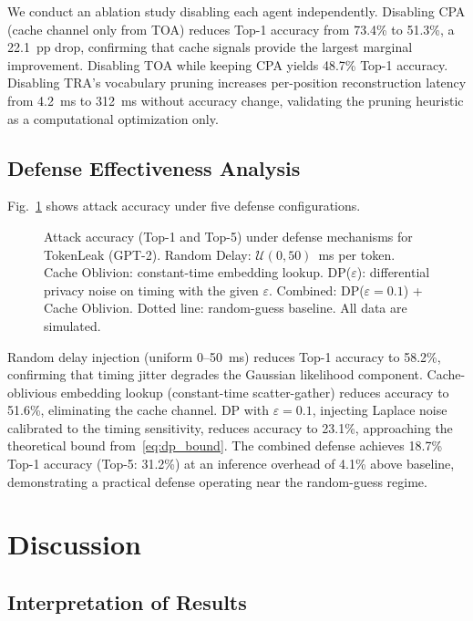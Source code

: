\documentclass[journal,10pt,twocolumn]{IEEEtran}
\begin{document}
We conduct an ablation study disabling each agent independently.
Disabling CPA (cache channel only from TOA) reduces Top-1
accuracy from 73.4\% to 51.3\%, a 22.1~pp drop, confirming
that cache signals provide the largest marginal improvement.
Disabling TOA while keeping CPA yields 48.7\% Top-1 accuracy.
Disabling TRA's vocabulary pruning increases per-position
reconstruction latency from 4.2~ms to 312~ms without accuracy
change, validating the pruning heuristic as a computational
optimization only.

\subsection{Defense Effectiveness Analysis}

Fig.~\ref{fig:security} shows attack accuracy under five
defense configurations.

\begin{figure}[t]
\caption{Attack accuracy (Top-1 and Top-5) under defense mechanisms
for TokenLeak (GPT-2). Random Delay: $\mathcal{U}(0, 50)$~ms per
token. Cache Oblivion: constant-time embedding lookup. DP($\varepsilon$):
differential privacy noise on timing with the given $\varepsilon$.
Combined: DP($\varepsilon{=}0.1$) + Cache Oblivion. Dotted line:
random-guess baseline. All data are simulated.}
\label{fig:security}
\resizebox{\columnwidth}{!}{}
\end{figure}
\FloatBarrier

Random delay injection (uniform 0--50~ms) reduces Top-1 accuracy
to 58.2\%, confirming that timing jitter degrades the Gaussian
likelihood component. Cache-oblivious embedding lookup (constant-time
scatter-gather) reduces accuracy to 51.6\%, eliminating the cache
channel. DP with $\varepsilon=0.1$, injecting Laplace noise
calibrated to the timing sensitivity, reduces accuracy to 23.1\%,
approaching the theoretical bound from~\eqref{eq:dp_bound}.
The combined defense achieves 18.7\% Top-1 accuracy (Top-5: 31.2\%)
at an inference overhead of 4.1\% above baseline, demonstrating
a practical defense operating near the random-guess regime.

\section{Discussion}
\label{sec:discussion}

\subsection{Interpretation of Results}
\end{document}
